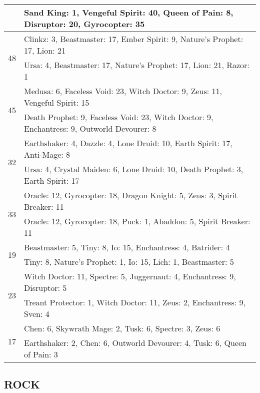 \documentclass[result.tex]{subfiles}
\begin{document}
\begin{table}[H]
\begin{tabular}{ | c | p{12.5cm} | }
    & Sand King: 1, Vengeful Spirit: 40, Queen of Pain: 8, Disruptor: 20, Gyrocopter: 35 \\
    \hline
    \multirow{2}{*}{48}
    & Clinkz: 3, Beastmaster: 17, Ember Spirit: 9, Nature's Prophet: 17, Lion: 21 \\
    & Ursa: 4, Beastmaster: 17, Nature's Prophet: 17, Lion: 21, Razor: 1 \\
    \hline
    \multirow{2}{*}{45}
    & Medusa: 6, Faceless Void: 23, Witch Doctor: 9, Zeus: 11, Vengeful Spirit: 15 \\
    & Death Prophet: 9, Faceless Void: 23, Witch Doctor: 9, Enchantress: 9, Outworld Devourer: 8 \\
    \hline
    \multirow{2}{*}{32}
    & Earthshaker: 4, Dazzle: 4, Lone Druid: 10, Earth Spirit: 17, Anti-Mage: 8 \\
    & Ursa: 4, Crystal Maiden: 6, Lone Druid: 10, Death Prophet: 3, Earth Spirit: 17 \\
    \hline
    \multirow{2}{*}{33}
    & Oracle: 12, Gyrocopter: 18, Dragon Knight: 5, Zeus: 3, Spirit Breaker: 11 \\
    & Oracle: 12, Gyrocopter: 18, Puck: 1, Abaddon: 5, Spirit Breaker: 11 \\
    \hline
    \multirow{2}{*}{19}
    & Beastmaster: 5, Tiny: 8, Io: 15, Enchantress: 4, Batrider: 4 \\
    & Tiny: 8, Nature's Prophet: 1, Io: 15, Lich: 1, Beastmaster: 5 \\
    \hline
    \multirow{2}{*}{23}
    & Witch Doctor: 11, Spectre: 5, Juggernaut: 4, Enchantress: 9, Disruptor: 5 \\
    & Treant Protector: 1, Witch Doctor: 11, Zeus: 2, Enchantress: 9, Sven: 4 \\
    \hline
    \multirow{2}{*}{17}
    & Chen: 6, Skywrath Mage: 2, Tusk: 6, Spectre: 3, Zeus: 6 \\
    & Earthshaker: 2, Chen: 6, Outworld Devourer: 4, Tusk: 6, Queen of Pain: 3 \\
    \hline
  \end{tabular}
  \caption{}
  \label{}
\end{table}

\newpage

\subsection*{ROCK}
\end{document}
